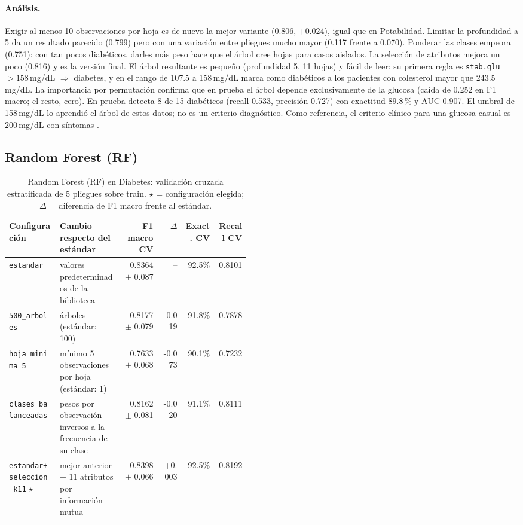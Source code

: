 \documentclass[11pt]{article}
\begin{document}
\paragraph{Análisis.} Exigir al menos 10 observaciones por hoja es de nuevo la mejor variante (0.806, +0.024),
igual que en Potabilidad. Limitar la profundidad a 5 da un resultado parecido (0.799)
pero con una variación entre pliegues mucho mayor (0.117 frente a 0.070). Ponderar las clases empeora (0.751): con
tan pocos diabéticos, darles más peso hace que el árbol cree hojas para casos
aislados. La selección de atributos mejora un poco (0.816) y es la versión final. El
árbol resultante es pequeño (profundidad 5, 11 hojas) y fácil de leer: su primera regla
es \texttt{stab.glu} $>158$\,mg/dL $\Rightarrow$ diabetes, y en el rango de 107.5 a
158\,mg/dL marca como diabéticos a los pacientes con colesterol mayor que 243.5\,mg/dL. La importancia por
permutación confirma que en prueba el árbol depende exclusivamente de la glucosa (caída
de 0.252 en F1 macro; el resto, cero). En prueba detecta 8 de 15 diabéticos (recall
0.533, precisión 0.727) con exactitud 89.8\,\% y AUC 0.907. El umbral de 158\,mg/dL lo
aprendió el árbol de estos datos; no es un criterio diagnóstico. Como referencia, el
criterio clínico para una glucosa casual es 200\,mg/dL con síntomas \cite{ada}.

\FloatBarrier

\subsection{Random Forest (RF)}

\begin{table}[H]\centering\footnotesize
\caption{Random Forest (RF) en Diabetes: validación cruzada estratificada de 5 pliegues sobre train. $\star$ = configuración elegida; $\Delta$ = diferencia de F1 macro frente al estándar.}
\begin{tabular}{>{\raggedright\arraybackslash}p{0.21\linewidth}>{\raggedright\arraybackslash}p{0.26\linewidth}rrrr}\toprule
Configuración & Cambio respecto del estándar & F1 macro CV & $\Delta$ & Exact. CV & Recall CV \\ \midrule
\texttt{estandar} & valores predeterminados de la biblioteca & 0.8364 $\pm$ 0.087 & -- & 92.5\% & 0.8101 \\
\texttt{500\_\allowbreak{}arboles} & 500 árboles (estándar: 100) & 0.8177 $\pm$ 0.079 & -0.019 & 91.8\% & 0.7878 \\
\texttt{hoja\_\allowbreak{}minima\_\allowbreak{}5} & mínimo 5 observaciones por hoja (estándar: 1) & 0.7633 $\pm$ 0.068 & -0.073 & 90.1\% & 0.7232 \\
\texttt{clases\_\allowbreak{}balanceadas} & pesos por observación inversos a la frecuencia de su clase & 0.8162 $\pm$ 0.081 & -0.020 & 91.1\% & 0.8111 \\
\texttt{estandar+\allowbreak{}seleccion\_\allowbreak{}k11} $\star$ & mejor anterior + 11 atributos por información mutua & 0.8398 $\pm$ 0.066 & +0.003 & 92.5\% & 0.8192 \\
\bottomrule\end{tabular}
\end{table}
\end{document}
